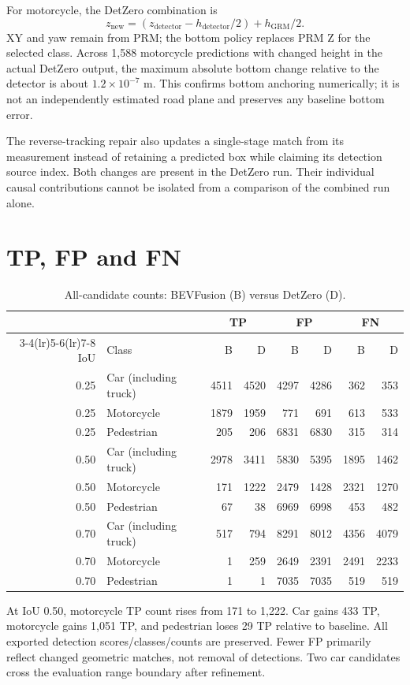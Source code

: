 \documentclass[a4paper,11pt]{article}
\begin{document}
For motorcycle, the DetZero combination is
\begin{equation}
z_{\mathrm{new}}=\left(z_{\mathrm{detector}}-h_{\mathrm{detector}}/2\right)+h_{\mathrm{GRM}}/2.
\end{equation}
XY and yaw remain from PRM; the bottom policy replaces PRM Z for the selected class. Across 1,588 motorcycle predictions with changed height in the actual DetZero output, the maximum absolute bottom change relative to the detector is about $1.2\times10^{-7}$ m. This confirms bottom anchoring numerically; it is not an independently estimated road plane and preserves any baseline bottom error.

The reverse-tracking repair also updates a single-stage match from its measurement instead of retaining a predicted box while claiming its detection source index. Both changes are present in the DetZero run. Their individual causal contributions cannot be isolated from a comparison of the combined run alone.

\section{TP, FP and FN}
\begin{table}[H]\centering\small
\caption{All-candidate counts: BEVFusion (B) versus DetZero (D).}
\setlength{\tabcolsep}{4pt}
\begin{tabular}{rlrrrrrr}\toprule
& & \multicolumn{2}{c}{TP} & \multicolumn{2}{c}{FP} & \multicolumn{2}{c}{FN} \\
\cmidrule(lr){3-4}\cmidrule(lr){5-6}\cmidrule(lr){7-8}
IoU & Class & B & D & B & D & B & D \\
\midrule
0.25 & Car (including truck) & 4511 & 4520 & 4297 & 4286 & 362 & 353 \\
0.25 & Motorcycle & 1879 & 1959 & 771 & 691 & 613 & 533 \\
0.25 & Pedestrian & 205 & 206 & 6831 & 6830 & 315 & 314 \\
0.50 & Car (including truck) & 2978 & 3411 & 5830 & 5395 & 1895 & 1462 \\
0.50 & Motorcycle & 171 & 1222 & 2479 & 1428 & 2321 & 1270 \\
0.50 & Pedestrian & 67 & 38 & 6969 & 6998 & 453 & 482 \\
0.70 & Car (including truck) & 517 & 794 & 8291 & 8012 & 4356 & 4079 \\
0.70 & Motorcycle & 1 & 259 & 2649 & 2391 & 2491 & 2233 \\
0.70 & Pedestrian & 1 & 1 & 7035 & 7035 & 519 & 519 \\
\bottomrule\end{tabular}\end{table}
At IoU 0.50, motorcycle TP count rises from 171 to 1,222. Car gains 433 TP, motorcycle gains 1,051 TP, and pedestrian loses 29 TP relative to baseline. All exported detection scores/classes/counts are preserved. Fewer FP primarily reflect changed geometric matches, not removal of detections. Two car candidates cross the evaluation range boundary after refinement.
\end{document}
